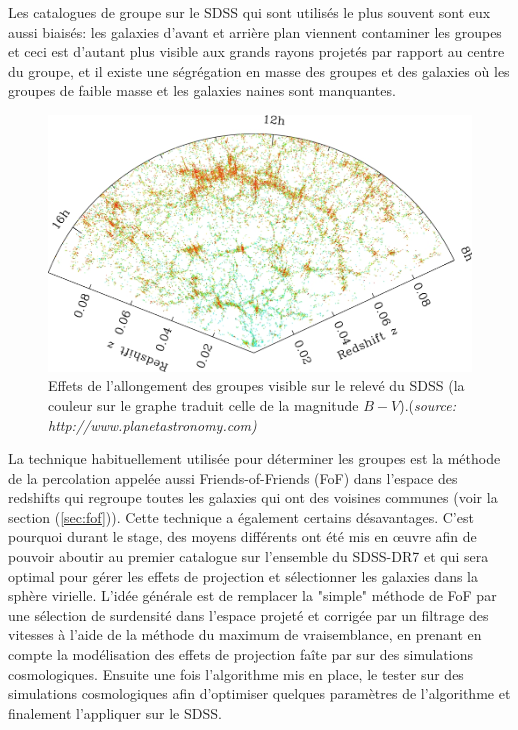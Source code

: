 Les catalogues de groupe sur le SDSS qui sont utilisés le plus souvent sont eux aussi biaisés: les galaxies d'avant et arrière plan
viennent contaminer les groupes et ceci est d'autant plus visible aux grands rayons projetés par rapport au centre du groupe, et il
existe une ségrégation en masse des groupes et des galaxies où les groupes de faible masse et les galaxies naines sont manquantes.
\begin{figure}[H]
	\centering
	\includegraphics[width=0.5\linewidth]{sdss_voids.jpg}
	\caption{\footnotesize{}Effets de l'allongement des groupes visible sur le relevé du SDSS
	(la couleur sur le graphe traduit celle de la magnitude $B-V$).(\emph{source: http://www.planetastronomy.com)}}
	\label{fig:godfinger}
\end{figure}
La technique habituellement utilisée pour déterminer les groupes est la méthode de la percolation appelée aussi Friends-of-Friends
(FoF) dans l'espace des redshifts qui regroupe toutes les galaxies qui ont des voisines communes (voir la section (\ref{sec:fof})).
Cette technique a également certains désavantages. C'est pourquoi durant le stage, des moyens différents ont été mis en {\oe}uvre
afin de pouvoir aboutir au premier catalogue sur l'ensemble du SDSS-DR7 et qui sera optimal pour gérer les effets de projection et
sélectionner les galaxies dans la sphère virielle. L'idée générale est de remplacer la "simple" méthode de FoF par une sélection de
surdensité dans l'espace projeté et corrigée par un filtrage des vitesses à l'aide de la méthode du maximum de vraisemblance, en
prenant en compte la modélisation des effets de projection faîte par \citet{MBM10} sur des simulations cosmologiques. Ensuite une
fois l'algorithme mis en place, le tester sur des simulations cosmologiques afin d'optimiser quelques paramètres de l'algorithme et
finalement l'appliquer sur le SDSS.

